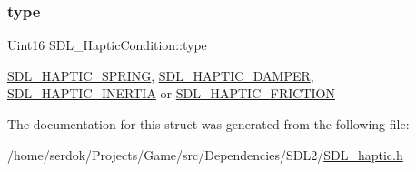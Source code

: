 \subsubsection{\texorpdfstring{type}{type}}
{\footnotesize\ttfamily Uint16 S\+D\+L\+\_\+\+Haptic\+Condition\+::type}

\hyperlink{SDL__haptic_8h_a3b52d4700380085e2b5d87bb20320fb1}{S\+D\+L\+\_\+\+H\+A\+P\+T\+I\+C\+\_\+\+S\+P\+R\+I\+NG}, \hyperlink{SDL__haptic_8h_a69522f261973e3ea4273486141320a87}{S\+D\+L\+\_\+\+H\+A\+P\+T\+I\+C\+\_\+\+D\+A\+M\+P\+ER}, \hyperlink{SDL__haptic_8h_a14b807471589120395aec28293cf6642}{S\+D\+L\+\_\+\+H\+A\+P\+T\+I\+C\+\_\+\+I\+N\+E\+R\+T\+IA} or \hyperlink{SDL__haptic_8h_a98a5011311168d63921aaac21403a4d8}{S\+D\+L\+\_\+\+H\+A\+P\+T\+I\+C\+\_\+\+F\+R\+I\+C\+T\+I\+ON} 

The documentation for this struct was generated from the following file\+:\begin{DoxyCompactItemize}
\item 
/home/serdok/\+Projects/\+Game/src/\+Dependencies/\+S\+D\+L2/\hyperlink{SDL__haptic_8h}{S\+D\+L\+\_\+haptic.\+h}\end{DoxyCompactItemize}
